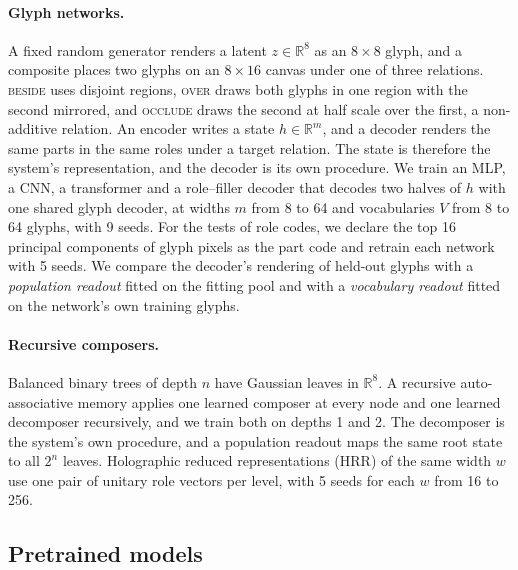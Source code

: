 \documentclass[10pt]{article}
\theoremstyle{plain}
\theoremstyle{remark}
\newcommand{\R}{\mathbb{R}}
\begin{document}
\paragraph{Glyph networks.} A fixed random generator renders a latent $z \in \R^{8}$ as an $8 \times 8$ glyph, and a composite places two glyphs on an $8 \times 16$ canvas under one of three relations. \textsc{beside} uses disjoint regions, \textsc{over} draws both glyphs in one region with the second mirrored, and \textsc{occlude} draws the second at half scale over the first, a non-additive relation. An encoder writes a state $h \in \R^m$, and a decoder renders the same parts in the same roles under a target relation. The state is therefore the system's representation, and the decoder is its own procedure. We train an MLP, a CNN, a transformer and a role--filler decoder that decodes two halves of $h$ with one shared glyph decoder, at widths $m$ from 8 to 64 and vocabularies $V$ from 8 to 64 glyphs, with 9 seeds. For the tests of role codes, we declare the top 16 principal components of glyph pixels as the part code and retrain each network with 5 seeds. We compare the decoder's rendering of held-out glyphs with a \emph{population readout} fitted on the fitting pool and with a \emph{vocabulary readout} fitted on the network's own training glyphs.

\paragraph{Recursive composers.} Balanced binary trees of depth $n$ have Gaussian leaves in $\R^8$. A recursive auto-associative memory \citep{pollack1990} applies one learned composer at every node and one learned decomposer recursively, and we train both on depths 1 and 2. The decomposer is the system's own procedure, and a population readout maps the same root state to all $2^n$ leaves. Holographic reduced representations (HRR) of the same width $w$ use one pair of unitary role vectors per level, with 5 seeds for each $w$ from 16 to 256.

\subsection{Pretrained models}
\label{sec:design_pretrained}
\end{document}
